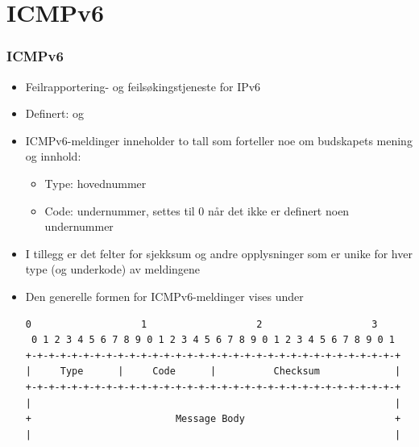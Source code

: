 \section{ICMPv6}
\begin{frame}[fragile]%
  \frametitle{ICMPv6}
  \pause
  \begin{itemize}[<+->]
  \item Feilrapportering- og feilsøkingstjeneste for IPv6
  \item Definert:  og 
  \item ICMPv6-meldinger inneholder to tall som forteller noe om
    budskapets mening og innhold:
    \begin{itemize}[<+->]
    \item Type: hovednummer
    \item Code: undernummer, settes til 0 når det ikke er definert
      noen undernummer
    \end{itemize}
  \item I tillegg er det felter for sjekksum og andre opplysninger som
    er unike for hver type (og underkode) av meldingene
  \item Den generelle formen for ICMPv6-meldinger vises under
\begin{Verbatim}[fontsize=\tiny]
 0                   1                   2                   3
 0 1 2 3 4 5 6 7 8 9 0 1 2 3 4 5 6 7 8 9 0 1 2 3 4 5 6 7 8 9 0 1
+-+-+-+-+-+-+-+-+-+-+-+-+-+-+-+-+-+-+-+-+-+-+-+-+-+-+-+-+-+-+-+-+
|     Type      |     Code      |          Checksum             |
+-+-+-+-+-+-+-+-+-+-+-+-+-+-+-+-+-+-+-+-+-+-+-+-+-+-+-+-+-+-+-+-+
|                                                               |
+                         Message Body                          +
|                                                               |
\end{Verbatim}
  \end{itemize}
\end{frame}


